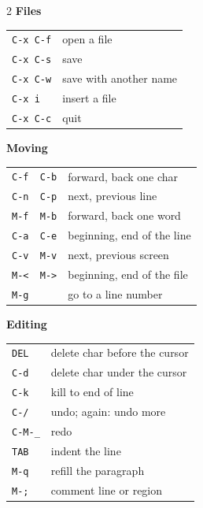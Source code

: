 \documentclass[a4paper,12pt,openany]{book}
\begin{document}
\begin{multicols}{2}
\small
\setlength{\parindent}{0pt}
\textbf{Files}\\[1pt]
{\large
\begin{tabular}{@{}>{\raggedright}p{2.35cm}@{\,}p{6.1cm}@{}}
\texttt{C-x C-f} &open a file\\
\texttt{C-x C-s} &save\\
\texttt{C-x C-w} &save with another name\\
\texttt{C-x i} &insert a file\\
\texttt{C-x C-c} &quit\\
\end{tabular}}
\vspace{7pt}

\textbf{Moving}\\[1pt]
{\large
\begin{tabular}{@{}>{\raggedright}p{2.35cm}@{\,}p{6.1cm}@{}}
  \texttt{C-f\,\,C-b} & forward, back one char\\
  \texttt{C-n\,\,C-p} & next, previous line\\
  \texttt{M-f\,\,M-b} & forward, back one word\\
  \texttt{C-a\,\,C-e} & beginning, end of the line\\
  \texttt{C-v\,\,M-v} & next, previous screen\\
  \texttt{M-<\,\,M->} & beginning, end of the file\\
  \texttt{M-g} & go to a line number\\
\end{tabular}}
\vspace{7pt}

\textbf{Editing}\\[1pt]
{\large
\begin{tabular}{@{}>{\raggedright}p{2.35cm}@{\,}p{6.1cm}@{}}
\texttt{DEL} & delete char before the cursor\\
\texttt{C-d} & delete char under the cursor\\
\texttt{C-k} & kill to end of line\\
\texttt{C-/} & undo; again: undo more\\
\texttt{C-M-\_} & redo\\
\texttt{TAB} & indent the line\\
\texttt{M-q} & refill the paragraph\\
\texttt{M-;} & comment line or region\\
\end{tabular}}
\vspace{7pt}


\end{multicols}
\end{document}
